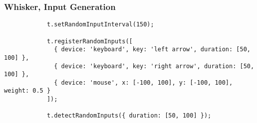 \begin{frame}[fragile]\frametitle{Whisker, Input Generation}
    \begin{center}
        \begin{minipage}{.95\textwidth}
            \begin{verbatim}
            t.setRandomInputInterval(150);

            t.registerRandomInputs([
              { device: 'keyboard', key: 'left arrow', duration: [50, 100] },
              { device: 'keyboard', key: 'right arrow', duration: [50, 100] },
              { device: 'mouse', x: [-100, 100], y: [-100, 100], weight: 0.5 }
            ]);

            t.detectRandomInputs({ duration: [50, 100] });
            \end{verbatim}
        \end{minipage}
    \end{center}
\end{frame}

